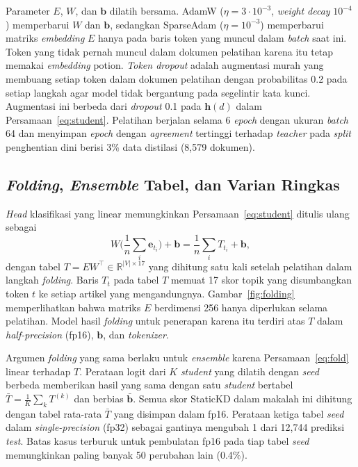 \documentclass{ieeeaccess}
\newcommand{\en}[1]{\textit{#1}}
\begin{document}
Parameter $E$, $W$, dan $\mathbf{b}$ dilatih bersama. AdamW ($\eta=3\cdot 10^{-3}$, \en{weight decay} $10^{-4}$) memperbarui $W$ dan $\mathbf{b}$, sedangkan SparseAdam ($\eta=10^{-3}$) memperbarui matriks \en{embedding} $E$ hanya pada baris token yang muncul dalam \en{batch} saat ini. Token yang tidak pernah muncul dalam dokumen pelatihan karena itu tetap memakai \en{embedding} potion. \en{Token dropout} adalah augmentasi murah yang membuang setiap token dalam dokumen pelatihan dengan probabilitas 0.2 pada setiap langkah agar model tidak bergantung pada segelintir kata kunci. Augmentasi ini berbeda dari \en{dropout} 0.1 pada $\mathbf{h}(d)$ dalam Persamaan~\eqref{eq:student}. Pelatihan berjalan selama 6 \en{epoch} dengan ukuran \en{batch} 64 dan menyimpan \en{epoch} dengan \en{agreement} tertinggi terhadap \en{teacher} pada \en{split} penghentian dini berisi 3\% data distilasi (8,579 dokumen).

\subsection{\en{Folding}, \en{Ensemble} Tabel, dan Varian Ringkas}
\label{sec:fold}
\en{Head} klasifikasi yang linear memungkinkan Persamaan~\eqref{eq:student} ditulis ulang sebagai
\begin{equation}
W\Big(\frac{1}{n}\sum_{i}\mathbf{e}_{t_i}\Big)+\mathbf{b}=\frac{1}{n}\sum_{i}T_{t_i}+\mathbf{b},
\label{eq:fold}
\end{equation}
dengan tabel $T=EW^{\top}\in\mathbb{R}^{|V|\times 17}$ yang dihitung satu kali setelah pelatihan dalam langkah \en{folding}. Baris $T_t$ pada tabel $T$ memuat 17 skor topik yang disumbangkan token $t$ ke setiap artikel yang mengandungnya. Gambar~\ref{fig:folding} memperlihatkan bahwa matriks $E$ berdimensi 256 hanya diperlukan selama pelatihan. Model hasil \en{folding} untuk penerapan karena itu terdiri atas $T$ dalam \en{half-precision} (fp16), $\mathbf{b}$, dan \en{tokenizer}.

Argumen \en{folding} yang sama berlaku untuk \en{ensemble} karena Persamaan~\eqref{eq:fold} linear terhadap $T$. Perataan logit dari $K$ \en{student} yang dilatih dengan \en{seed} berbeda memberikan hasil yang sama dengan satu \en{student} bertabel $\bar{T}=\frac{1}{K}\sum_k T^{(k)}$ dan berbias $\bar{\mathbf{b}}$. Semua skor StaticKD dalam makalah ini dihitung dengan tabel rata-rata $\bar{T}$ yang disimpan dalam fp16. Perataan ketiga tabel \en{seed} dalam \en{single-precision} (fp32) sebagai gantinya mengubah 1 dari 12,744 prediksi \en{test}. Batas kasus terburuk untuk pembulatan fp16 pada tiap tabel \en{seed} memungkinkan paling banyak 50 perubahan lain (0.4\%).
\end{document}
